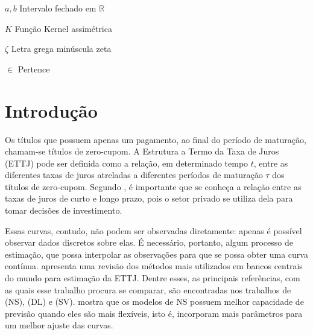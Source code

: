 \documentclass[
	12pt,				%
	openright,			%
	oneside,			%
	a4paper,			%
	english,			%
	brazil				%
	]{dissertacao-ufrgs-abntex2}
\begin{document}
\begin{simbolos}
  \item[$ a,b $] Intervalo fechado em $\mathbb{R}$
  \item[$ K $] Função Kernel assimétrica
  \item[$ \zeta $] Letra grega minúscula zeta
  \item[$ \in $] Pertence
\end{simbolos}

\tableofcontents*
\cleardoublepage



\textual

\chapter*[Introdução]{Introdução}


Os títulos que possuem apenas um pagamento, ao final do período de
maturação, chamam-se títulos de zero-cupom. A Estrutura a Termo da
Taxa de Juros (ETTJ) pode ser definida como a relação, em determinado tempo $t$, entre as diferentes taxas de juros atreladas
a diferentes períodos de maturação $\tau$ dos títulos de zero-cupom.
Segundo , é importante que se conheça a relação
entre as taxas de juros de curto e longo prazo, pois o setor privado
se utiliza dela para tomar decisões de investimento.

Essas curvas, contudo, não podem ser observadas diretamente: apenas é possível 
observar dados discretos sobre elas. É necessário, portanto, algum
processo de estimação, que possa interpolar as observações para que
se possa obter uma curva contínua.   apresenta
uma revisão dos métodos mais utilizados em bancos centrais do mundo
para estimação da ETTJ. Dentre esses, as principais referências, com
as quais esse trabalho procura se comparar, são encontradas nos trabalhos 
de (NS), 
(DL) e (SV).
 mostra que os modelos de NS possuem
melhor capacidade de previsão quando eles são mais flexíveis, isto é, incorporam mais parâmetros para um melhor ajuste das curvas.
\end{document}
